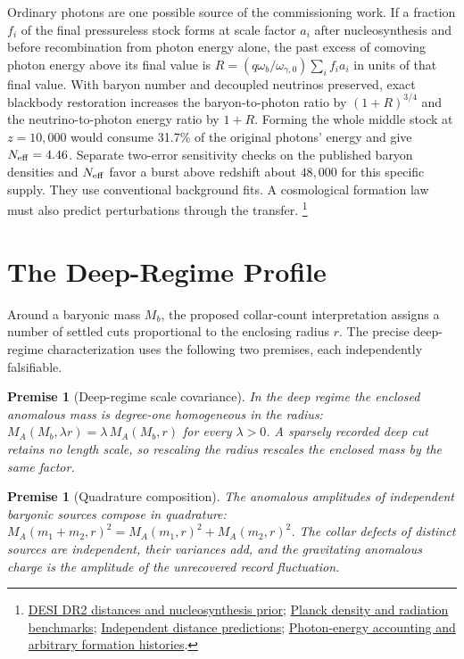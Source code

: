 \documentclass[11pt]{article}
\newtheorem{premise}[theorem]{Premise}
\begin{document}
Ordinary photons are one possible source of the commissioning work.
If a fraction $f_i$ of the final pressureless stock forms at scale
factor $a_i$ after nucleosynthesis and before recombination from photon
energy alone, the past excess of comoving photon energy above its final
value is $R=(q\omega_b/\omega_{\gamma,0})\sum_i f_i a_i$ in units of
that final value. With baryon number and decoupled neutrinos preserved,
exact blackbody restoration increases the baryon-to-photon ratio by
$(1+R)^{3/4}$ and the neutrino-to-photon energy ratio by $1+R$.
Forming the whole middle stock at $z=10{,}000$ would consume 31.7\% of
the original photons' energy and give $N_{\rm eff}=4.46$. Separate
two-error sensitivity checks on the published baryon densities and
$N_{\rm eff}$ favor a burst above redshift about $48{,}000$ for this
specific supply. They use conventional background fits. A cosmological
formation law must also predict perturbations through the transfer.%
\footnote{\href{https://arxiv.org/abs/2503.14738}{DESI DR2 distances and nucleosynthesis prior};
\href{https://arxiv.org/abs/1807.06209}{Planck density and radiation benchmarks};
\href{https://github.com/FloatingPragma/observer-patch-holography/tree/main/code/cosmology/paid_trail_bao}{Independent distance predictions};
\href{https://github.com/FloatingPragma/observer-patch-holography/tree/main/code/cosmology/record_abundance/photon_supply}{Photon-energy accounting and arbitrary formation histories}.}

\section{The Deep-Regime Profile}
\label{sec:deep}

Around a baryonic mass \(M_b\), the proposed collar-count interpretation
assigns a number of settled cuts proportional to the enclosing radius
\(r\). The precise deep-regime characterization uses the following two
premises, each independently falsifiable.

\begin{premise}[Deep-regime scale covariance]
\label{pre:cov}
In the deep regime the enclosed anomalous mass is degree-one homogeneous in
the radius: \(M_A(M_b,\lambda r)=\lambda\,M_A(M_b,r)\) for every
\(\lambda>0\). A sparsely recorded deep cut retains no length scale, so
rescaling the radius rescales the enclosed mass by the same factor.
\end{premise}

\begin{premise}[Quadrature composition]
\label{pre:quad}
The anomalous amplitudes of independent baryonic sources compose in
quadrature:
\(M_A(m_1+m_2,r)^2=M_A(m_1,r)^2+M_A(m_2,r)^2\). The collar defects of
distinct sources are independent, their variances add, and the gravitating
anomalous charge is the amplitude of the unrecovered record fluctuation.
\end{premise}
\end{document}
